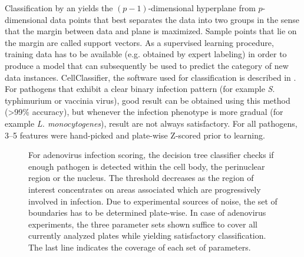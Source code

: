 Classification by an  yields the $(p-1)$-dimensional hyperplane from $p$-dimensional data points that best separates the data into two groups in the sense that the margin between data and plane is maximized. Sample points that lie on the margin are called support vectors. As a supervised learning procedure, training data has to be available (e.g. obtained by expert labeling) in order to produce a model that can subsequently be used to predict the category of new data instances. CellClassifier, the software used for  classification is described in \citet{Ramo2009}. For pathogens that exhibit a clear binary infection pattern (for example \textit{S}. typhimurium or vaccinia virus), good result can be obtained using this method (\textgreater 99\% accuracy), but whenever the infection phenotype is more gradual (for example \textit{L. monocytogenes}), result are not always satisfactory. For all pathogens, 3--5 features were hand-picked and plate-wise Z-scored prior to  learning.


\renewcommand{\arraystretch}{1.5}
\setlength{\tabcolsep}{0.5em}
\begin{figure}
  \centering

  \vspace{5mm}
  \footnotesize
  

  \vspace{5mm}
  \caption[Decision tree for adenovirus infection scoring.]{For adenovirus infection scoring, the decision tree classifier checks if enough pathogen is detected within the cell body, the perinuclear region or the nucleus. The threshold decreases as the region of interest concentrates on areas associated which are progressively involved in infection. Due to experimental sources of noise, the set of boundaries has to be determined plate-wise. In case of adenovirus experiments, the three parameter sets shown suffice to cover all currently analyzed plates while yielding satisfactory classification. The last line indicates the coverage of each set of parameters.}
  \label{fig:dectree-adeno}
\end{figure}

